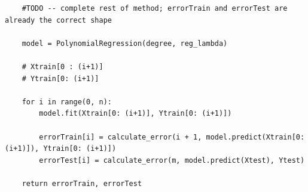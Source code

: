 \documentclass{article}
\newcommand{\1}{\mathbf{1}}
\begin{document}
{\begin{verbatim}
    #TODO -- complete rest of method; errorTrain and errorTest are already the correct shape

    model = PolynomialRegression(degree, reg_lambda)

    # Xtrain[0 : (i+1)]
    # Ytrain[0: (i+1)]

    for i in range(0, n):
        model.fit(Xtrain[0: (i+1)], Ytrain[0: (i+1)])

        errorTrain[i] = calculate_error(i + 1, model.predict(Xtrain[0: (i+1)]), Ytrain[0: (i+1)])
        errorTest[i] = calculate_error(m, model.predict(Xtest), Ytest)

    return errorTrain, errorTest

\end{verbatim}

\newpage

}
\end{document}
